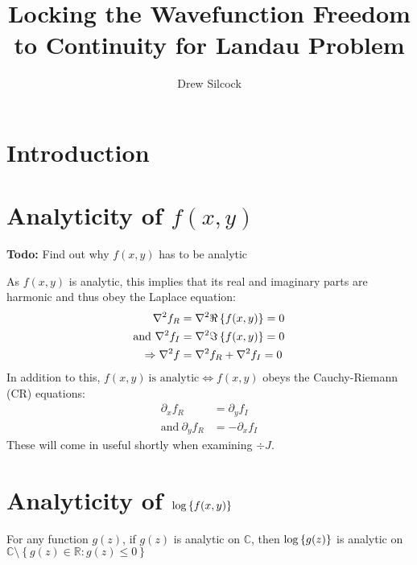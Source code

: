 \documentclass{article}
\title{Locking the Wavefunction Freedom to Continuity for Landau Problem}
\author{Drew Silcock}
\begin{document}
\maketitle

\section{Introduction}

\section{Analyticity of $f(x,y)$}

\textbf{Todo:} Find out why $f(x,y)$ has to be analytic

As $f(x,y)$ is analytic, this implies that its real and imaginary parts are
harmonic and thus obey the Laplace equation:
\begin{align}
                   \nabla^2 f_R &= \nabla^2 \Re \left\{ f(x,y) \right\} = 0 \\
    \textrm{and} ~ \nabla^2 f_I &= \nabla^2 \Im \left\{ f(x,y) \right\} = 0 \\
    \Rightarrow    \nabla^2 f   &= \nabla^2 f_R + \nabla^2 f_I = 0
\end{align}
In addition to this, $f(x,y) ~ \textrm{is analytic} \Leftrightarrow f(x,y)$
obeys the Cauchy-Riemann (CR) equations:
\begin{align}
    \partial_x f_R &= \partial_y f_I \\
    \textrm{and} ~ \partial_y f_R &= - \partial_x f_I
\end{align}
These will come in useful shortly when examining $\div{J}$.

\section{Analyticity of $\log \left\{ f(x,y) \right\}$}

For any function $g(z)$, if $g(z)$ is analytic on $\mathbb{C}$, then
$\log \left\{ g(z) \right\}$ is analytic on $\mathbb{C} \setminus \left\{ g(z) \in
\mathbb{R} : g(z) \leq 0 \right\}$ %
\end{document}
